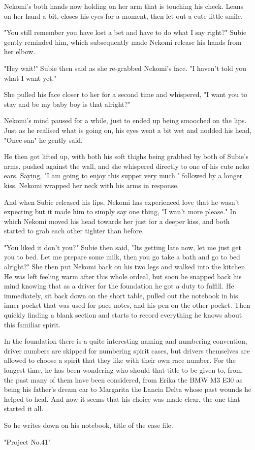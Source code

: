 Nekomi's both hands now holding on her arm that is touching his cheek. 
Leans on her hand a bit, closes his eyes for a moment, then let out a cute little smile. 

"You still remember you have lost a bet and have to do what I say right?" Subie gently reminded him, which subsequently made Nekomi release his hands from her elbow. 

"Hey wait!" Subie then said as she re-grabbed Nekomi's face. "I haven't told you what I want yet."

She pulled his face closer to her for a second time and whispered, "I want you to stay and be my baby boy is that alright?"

Nekomi's mind paused for a while, just to ended up being smooched on the lips. 
Just as he realised what is going on, his eyes went a bit wet and nodded his head, "Onee-san" he gently said. 

He then got lifted up, with both his soft thighs being grabbed by both of Subie's arms, pushed against the wall, and she whispered directly to one of his cute neko ears. 
Saying, "I am going to enjoy this supper very much." followed by a longer kiss. 
Nekomi wrapped her neck with his arms in response. 

And when Subie released his lips, Nekomi has experienced love that he wasn't expecting but it made him to simply say one thing, "I wan't more please." In which Nekomi moved his head towards her just for a deeper kiss, and both started to grab each other tighter than before. 

"You liked it don't you?" Subie then said, "Its getting late now, let me just get you to bed. Let me prepare some milk, then you go take a bath and go to bed alright?" She then put Nekomi back on his two legs and walked into the kitchen. 
He was left feeling warm after this whole ordeal, but soon he snapped back his mind knowing that as a driver for the foundation he got a duty to fulfill. 
He immediately, sit back down on the short table, pulled out the notebook in his inner pocket that was used for pace notes, and his pen on the other pocket. 
Then quickly finding a blank section and starts to record everything he knows about this familiar spirit. 

In the foundation there is a quite interesting naming and numbering convention, driver numbers are skipped for numbering spirit cases, but drivers themselves are allowed to choose a spirit that they like with their own race number. 
For the longest time, he has been wondering who should that title to be given to, from the past many of them have been considered, from Erika the BMW M3 E30 as being his father's dream car to Margarita the Lancia Delta whose past wounds he helped to heal. 
And now it seems that his choice was made clear, the one that started it all. 

So he writes down on his notebook, title of the case file. 

"Project No.41"
